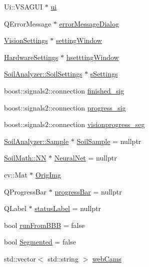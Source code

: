 \begin{DoxyCompactItemize}
\item 
Ui\+::\+V\+S\+A\+G\+U\+I $\ast$ \hyperlink{class_v_s_a_g_u_i_a7a1d0cb3cf813ff9dce12f7f0ed6cd7a}{ui}
\item 
Q\+Error\+Message $\ast$ \hyperlink{class_v_s_a_g_u_i_af01408e987e5df2ce336ee8447841c1f}{error\+Message\+Dialog}
\item 
\hyperlink{class_vision_settings}{Vision\+Settings} $\ast$ \hyperlink{class_v_s_a_g_u_i_a76c2e60393e9a3d61bcc22fd02b80b87}{setting\+Window}
\item 
\hyperlink{class_hardware_settings}{Hardware\+Settings} $\ast$ \hyperlink{class_v_s_a_g_u_i_ad7a55217e7216e0badaa15e12a7654ff}{hsettting\+Window}
\item 
\hyperlink{class_soil_analyzer_1_1_soil_settings}{Soil\+Analyzer\+::\+Soil\+Settings} $\ast$ \hyperlink{class_v_s_a_g_u_i_a4a0358d00aa3cb520a9a1321962b0d4d}{s\+Settings}
\item 
boost\+::signals2\+::connection \hyperlink{class_v_s_a_g_u_i_a670325c6bab3874937f0a9b7e8e3b370}{finished\+\_\+sig}
\item 
boost\+::signals2\+::connection \hyperlink{class_v_s_a_g_u_i_a3503e0415ff202c93fc4d7ee5c6f4fb8}{progress\+\_\+sig}
\item 
boost\+::signals2\+::connection \hyperlink{class_v_s_a_g_u_i_a524d706a05977a319c6381aae3f313de}{visionprogress\+\_\+seg}
\item 
\hyperlink{class_soil_analyzer_1_1_sample}{Soil\+Analyzer\+::\+Sample} $\ast$ \hyperlink{class_v_s_a_g_u_i_ac90517c9baea0a75455d43d5eb77d3e7}{Soil\+Sample} = nullptr
\item 
\hyperlink{class_soil_math_1_1_n_n}{Soil\+Math\+::\+N\+N} $\ast$ \hyperlink{class_v_s_a_g_u_i_aaf0cb2947a03baddcb811eaa07c299e3}{Neural\+Net} = nullptr
\item 
cv\+::\+Mat $\ast$ \hyperlink{class_v_s_a_g_u_i_ae74be8a44b34a65cb189d9b58ee40455}{Orig\+Img}
\item 
Q\+Progress\+Bar $\ast$ \hyperlink{class_v_s_a_g_u_i_a17b71e08eeff21b28e3816ec5482473c}{progress\+Bar} = nullptr
\item 
Q\+Label $\ast$ \hyperlink{class_v_s_a_g_u_i_a8cbaaa3b5e0975b7a1101b9bef3c9b57}{status\+Label} = nullptr
\item 
bool \hyperlink{class_v_s_a_g_u_i_ad093d6fc67a6ad9e27948023ddba775d}{run\+From\+B\+B\+B} = false
\item 
bool \hyperlink{class_v_s_a_g_u_i_a7684dfb6ffa5e169d611f2070b8e5041}{Segmented} = false
\item 
std\+::vector$<$ std\+::string $>$ \hyperlink{class_v_s_a_g_u_i_a1177641d1293c486f77fa62e3c8ed26a}{web\+Cams}
\end{DoxyCompactItemize}



